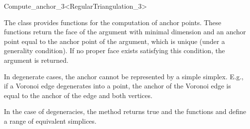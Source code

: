 \begin{ccRefClass}{Compute_anchor_3<RegularTriangulation_3>}

The class \ccClassTemplateName provides functions for the computation
of anchor points. These functions return the face of the argument with
minimal dimension and an anchor point equal to the anchor point of the
argument, which is unique (under a generality condition). If no proper
face exists satisfying this condition, the argument is returned.

 \ccGlue
{} \ccGlue
{} \ccGlue
{} \ccGlue
{}


\ccGlue
{}
\ccGlue
{}
\ccGlue
{}
\ccGlue
{}

%
In degenerate cases, the anchor cannot be represented by a simple
simplex. E.g., if a Voronoi edge degenerates into a point, the anchor
of the Voronoi edge is equal to the anchor of the edge and both
vertices.

In the case of degeneracies, the method  returns
true and the functions  and
 define a range of equivalent simplices.

\ccGlue
{}
\ccGlue
{}


\end{ccRefClass}

\ccRefPageEnd

